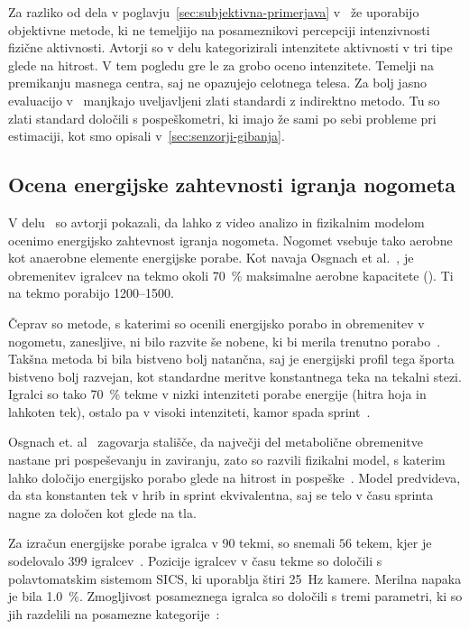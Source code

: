 Za razliko od dela v poglavju~\ref{sec:subjektivna-primerjava} v~\cite{silva2015assessing} že uporabijo objektivne metode, ki ne temeljijo na posameznikovi percepciji intenzivnosti fizične aktivnosti. Avtorji so v delu kategorizirali intenzitete aktivnosti v tri tipe glede na hitrost. V tem pogledu gre le za grobo oceno intenzitete. Temelji na premikanju masnega centra, saj ne opazujejo celotnega telesa. Za bolj jasno evaluacijo v~\cite{silva2015assessing} manjkajo uveljavljeni zlati standardi z indirektno metodo. Tu so zlati standard določili s pospeškometri, ki imajo že sami po sebi probleme pri estimaciji, kot smo opisali v~\ref{sec:senzorji-gibanja}.




\subsection{Ocena energijske zahtevnosti igranja nogometa}

V delu~\cite{osgnach2010energy} so avtorji pokazali, da lahko z video analizo in fizikalnim modelom ocenimo energijsko zahtevnost igranja nogometa. Nogomet vsebuje tako aerobne kot anaerobne elemente energijske porabe. Kot navaja Osgnach et al.~\cite{osgnach2010energy}, je obremenitev igralcev na tekmo okoli \SI{70}{\%} maksimalne aerobne kapacitete (\vomax). Ti na tekmo porabijo \SIrange{1200}{1500}{\kcal}. 

Čeprav so metode, s katerimi so ocenili energijsko porabo in obremenitev v nogometu, zanesljive, ni bilo razvite še nobene, ki bi merila trenutno porabo~\cite{osgnach2010energy}. Takšna metoda bi bila bistveno bolj natančna, saj je energijski profil tega športa bistveno bolj razvejan, kot standardne meritve konstantnega teka na tekalni stezi. Igralci so tako \SI{70}{\%} tekme v nizki intenziteti porabe energije (hitra hoja in lahkoten tek), ostalo pa v visoki intenziteti, kamor spada sprint~\cite{osgnach2010energy}. 

Osgnach et. al~\cite{osgnach2010energy} zagovarja stališče, da največji del metabolične obremenitve nastane pri pospeševanju in zaviranju, zato so razvili fizikalni model, s katerim lahko določijo energijsko porabo glede na hitrost in pospeške~\cite{osgnach2010energy}. Model predvideva, da sta konstanten tek v hrib in sprint ekvivalentna, saj se telo v času sprinta nagne za določen kot glede na tla.  

Za izračun energijske porabe igralca v \SI{90}{\min} tekmi, so snemali $56$ tekem, kjer je sodelovalo $399$ igralcev~\cite{osgnach2010energy}. Pozicije igralcev v času tekme so določili s polavtomatskim sistemom SICS, ki uporablja štiri \SI{25}{\Hz} kamere. Merilna napaka je bila \SI{1.0}{\%}. Zmogljivost posameznega igralca so določili s tremi parametri, ki so jih razdelili na posamezne kategorije~\cite{osgnach2010energy}:

